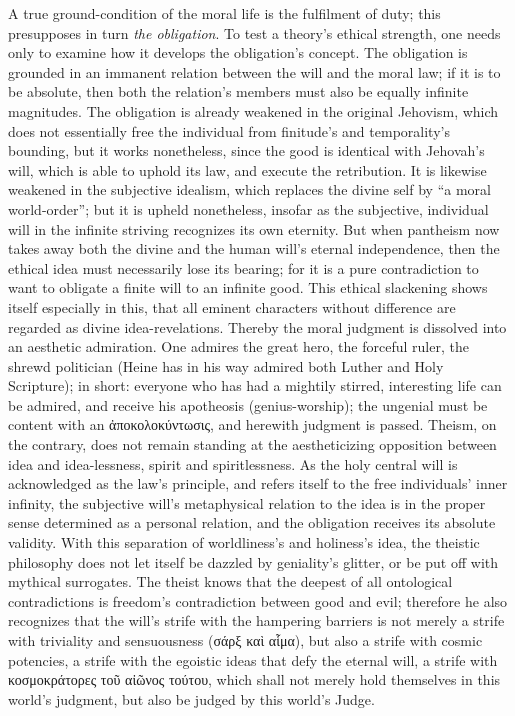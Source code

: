 \documentclass[12pt]{book}
\begin{document}
A true ground-condition of the moral life is the fulfilment of duty; this
presupposes in turn \emph{the obligation}. To test a theory's ethical
strength, one needs only to examine how it develops the obligation's
concept. The obligation is grounded in an immanent relation between the will
and the moral law; if it is to be absolute, then both the relation's members
must also be equally infinite magnitudes. The obligation is already weakened
in the original Jehovism, which does not essentially free the individual
from finitude's and temporality's bounding, but it works nonetheless, since
the good is identical with Jehovah's will, which is able to uphold its law,
and execute the retribution. It is likewise weakened in the subjective
idealism, which replaces the divine self by ``a moral world-order''; but it
is upheld nonetheless, insofar as the subjective, individual will in the
infinite striving recognizes its own eternity. But when pantheism now takes
away both the divine and the human will's eternal independence, then the
ethical idea must necessarily lose its bearing; for it is a pure
contradiction to want to obligate a finite will to an infinite good. This
ethical slackening shows itself especially in this, that all eminent
characters without difference are regarded as divine idea-revelations.
Thereby the moral judgment is dissolved into an aesthetic admiration. One
admires the great hero, the forceful ruler, the shrewd politician (Heine has
in his way admired both Luther and Holy Scripture); in short: everyone who
has had a mightily stirred, interesting life can be admired, and receive his
apotheosis (genius-worship); the ungenial must be content with an
ἀποκολοκύντωσις, and herewith judgment is passed. Theism, on the contrary,
does not remain standing at the aestheticizing opposition between idea and
idea-lessness, spirit and spiritlessness. As the holy central will is
acknowledged as the law's principle, and refers itself to the free
individuals' inner infinity, the subjective will's metaphysical relation to
the idea is in the proper sense determined as a personal relation, and the
obligation receives its absolute validity. With this separation of
worldliness's and holiness's idea, the theistic philosophy does not let
itself be dazzled by geniality's glitter, or be put off with mythical
surrogates. The theist knows that the deepest of all ontological
contradictions is freedom's contradiction between good and evil; therefore
he also recognizes that the will's strife with the hampering barriers is not
merely a strife with triviality and sensuousness (σάρξ καὶ αἷμα), but also a
strife with cosmic potencies, a strife with the egoistic ideas that defy the
eternal will, a strife with κοσμοκράτορες τοῦ αἰῶνος τούτου, which shall not
merely hold themselves in this world's judgment, but also be judged by this
world's Judge.
\end{document}
